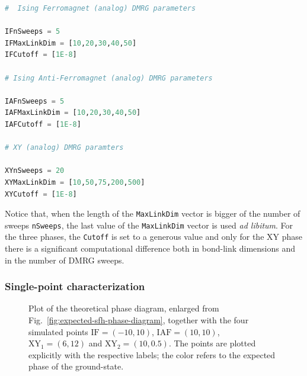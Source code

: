 \begin{lstlisting}[language=julia]
#  Ising Ferromagnet (analog) DMRG parameters

IFnSweeps = 5
IFMaxLinkDim = [10,20,30,40,50]
IFCutoff = [1E-8]

# Ising Anti-Ferromagnet (analog) DMRG parameters

IAFnSweeps = 5
IAFMaxLinkDim = [10,20,30,40,50]
IAFCutoff = [1E-8]

# XY (analog) DMRG paramters

XYnSweeps = 20
XYMaxLinkDim = [10,50,75,200,500]
XYCutoff = [1E-8]
\end{lstlisting}

\noindent Notice that, when the length of the \texttt{MaxLinkDim} vector is bigger of the number of sweeps \texttt{nSweeps}, the last value of the \texttt{MaxLinkDim} vector is used \textit{ad libitum}. For the three phases, the \texttt{Cutoff} is set to a generous value and only for the $\mathrm{XY}$ phase there is a significant computational difference both in bond-link dimensions and in the number of DMRG sweeps. 

\subsubsection{Single-point characterization}\label{subsubsec:single-point-characterization}

\begin{figure}
	\centering
	
	\caption{Plot of the theoretical phase diagram, enlarged from Fig.~\ref{fig:expected-sfh-phase-diagram}, together with the four simulated points $\mathrm{IF}=(-10,10)$, $\mathrm{IAF}=(10,10)$, $\mathrm{XY}_1=(6,12)$ and $\mathrm{XY}_2=(10,0.5)$. The points are plotted explicitly with the respective labels; the color refers to the expected phase of the ground-state.}
	\label{fig:points-expected-sfh-phase-diagram.tex}
\end{figure}

